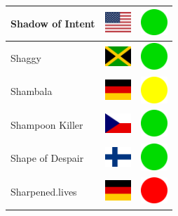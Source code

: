 \documentclass[12pt, a4paper, twoside]{report}
\begin{document}
\begin{center}
\begin{longtable}{|p{5cm}|p{2cm}|p{2cm}|}
 Shadow of Intent                                           & \includegraphics[width=1cm]{../4x3/us} &   \includegraphics[width=1cm]{../likes/y} \\ \hline
 Shaggy                                                     & \includegraphics[width=1cm]{../4x3/jm} &   \includegraphics[width=1cm]{../likes/y} \\ \hline
 Shambala                                                   & \includegraphics[width=1cm]{../4x3/de} &   \includegraphics[width=1cm]{../likes/m} \\ \hline
 Shampoon Killer                                            & \includegraphics[width=1cm]{../4x3/cz} &   \includegraphics[width=1cm]{../likes/y} \\ \hline
 Shape of Despair                                           & \includegraphics[width=1cm]{../4x3/fi} &   \includegraphics[width=1cm]{../likes/y} \\ \hline
 Sharpened.lives                                            & \includegraphics[width=1cm]{../4x3/de} &   \includegraphics[width=1cm]{../likes/n} \\ \hline

\end{longtable}
\end{center}
\end{document}
